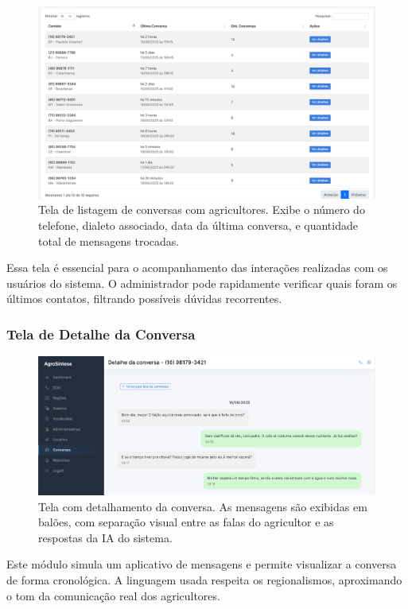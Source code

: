 \begin{figure}[H]
	\centering
	\includegraphics[width=0.95\linewidth]{images/adm-conversa-lista.png}
	\caption{Tela de listagem de conversas com agricultores. Exibe o número do telefone, dialeto associado, data da última conversa, e quantidade total de mensagens trocadas.}
\end{figure}

Essa tela é essencial para o acompanhamento das interações realizadas com os usuários do sistema. O administrador pode rapidamente verificar quais foram os últimos contatos, filtrando possíveis dúvidas recorrentes.

\subsubsection*{Tela de Detalhe da Conversa}

\begin{figure}[H]
	\centering
	\includegraphics[width=0.95\linewidth]{images/adm-conversa-detalhe.png}
	\caption{Tela com detalhamento da conversa. As mensagens são exibidas em balões, com separação visual entre as falas do agricultor e as respostas da IA do sistema.}
\end{figure}

Este módulo simula um aplicativo de mensagens e permite visualizar a conversa de forma cronológica. A linguagem usada respeita os regionalismos, aproximando o tom da comunicação real dos agricultores.

